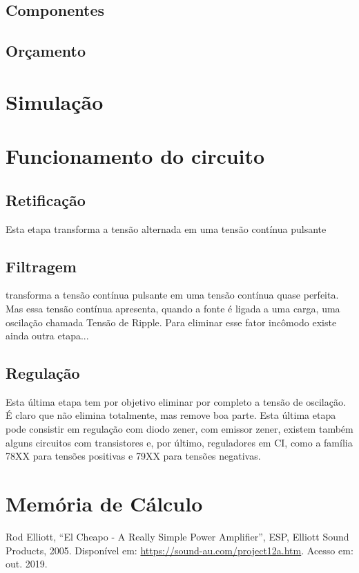 \documentclass[a4paper,12pt,oneside,openany,table,xcdraw]{article}
\begin{document}
\subsection{Componentes}
\subsection{Orçamento}

\section{Simulação}


\section{Funcionamento do circuito}


\subsection{Retificação}
Esta etapa transforma a tensão alternada em uma tensão contínua pulsante

\subsection{Filtragem}
transforma a tensão contínua pulsante em uma tensão contínua quase perfeita. Mas essa tensão contínua apresenta, quando a fonte é ligada a uma carga, uma oscilação chamada Tensão de Ripple. Para eliminar esse fator incômodo existe ainda outra etapa...

\subsection{Regulação}
Esta última etapa tem por objetivo eliminar por completo a tensão de oscilação.  É claro que não elimina totalmente, mas remove boa parte. Esta última etapa pode consistir em regulação com diodo zener, com emissor zener, existem também alguns circuitos com transistores e, por último, reguladores em CI, como a família 78XX para tensões positivas e 79XX para tensões negativas.


\section{Memória de Cálculo}

\newpage
\begin{thebibliography}{9} 

    Rod Elliott,
    “El Cheapo - A Really Simple Power Amplifier”, ESP, Elliott Sound Products, 2005.
 Disponível em:
 \url{https://sound-au.com/project12a.htm}. Acesso em: out. 2019.

\end{thebibliography}
\end{document}
